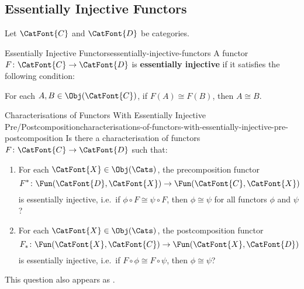 \subsection{Essentially Injective Functors}\label{subsection-essentially-injective-functors}
Let $\CatFont{C}$ and $\CatFont{D}$ be categories.
\begin{definition}{Essentially Injective Functors}{essentially-injective-functors}%
    A functor $F\colon\CatFont{C}\to\CatFont{D}$ is \textbf{essentially injective} if it satisfies the following condition:
    \begin{itemize}
        \itemstar For each $A,B\in\Obj(\CatFont{C})$, if $F(A)\cong F(B)$, then $A\cong B$.
    \end{itemize}
\end{definition}
\begin{question}{Characterisations of Functors With Essentially Injective Pre/Postcomposition}{characterisations-of-functors-with-essentially-injective-pre-postcomposition}%
    Is there a characterisation of functors $F\colon\CatFont{C}\to\CatFont{D}$ such that:
    \begin{enumerate}
        \item\label{characterisations-of-functors-with-essentially-injective-pre-postcomposition-a}For each $\CatFont{X}\in\Obj(\Cats)$, the precomposition functor
            \[
                F^{*}%
                \colon%
                \Fun(\CatFont{D},\CatFont{X})%
                \to%
                \Fun(\CatFont{C},\CatFont{X})%
            \]%
            is essentially injective, i.e.\ if $\phi\circ F\cong\psi\circ F$, then $\phi\cong\psi$ for all functors $\phi$ and $\psi$?
        \item\label{characterisations-of-functors-with-essentially-injective-pre-postcomposition-b}For each $\CatFont{X}\in\Obj(\Cats)$, the postcomposition functor
            \[
                F_{*}%
                \colon%
                \Fun(\CatFont{X},\CatFont{C})%
                \to%
                \Fun(\CatFont{X},\CatFont{D})%
            \]%
            is essentially injective, i.e.\ if $F\circ\phi\cong F\circ\psi$, then $\phi\cong\psi$?
    \end{enumerate}
    This question also appears as \cite{MO468125}.
\end{question}
